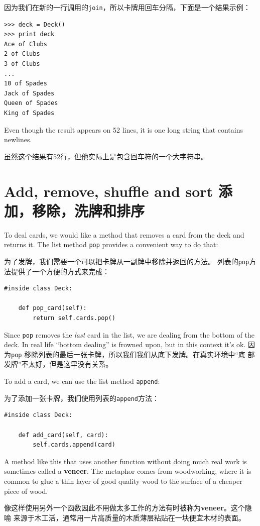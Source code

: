\documentclass[10pt]{book}
\begin{document}
\begin{CJK}{UTF8}{gbsn}
因为我们在新的一行调用的{\tt join}，所以卡牌用回车分隔，下面是一个结果示例：

\begin{verbatim}
>>> deck = Deck()
>>> print deck
Ace of Clubs
2 of Clubs
3 of Clubs
...
10 of Spades
Jack of Spades
Queen of Spades
King of Spades
\end{verbatim}
%
Even though the result appears on 52 lines, it is
one long string that contains newlines.

虽然这个结果有52行，但他实际上是包含回车符的一个大字符串。


\section{Add, remove, shuffle and sort 添加，移除，洗牌和排序}

To deal cards, we would like a method that
removes a card from the deck and returns it.
The list method {\tt pop} provides a convenient way to do that:

为了发牌，我们需要一个可以把卡牌从一副牌中移除并返回的方法。
列表的{\tt pop}方法提供了一个方便的方式来完成：

\begin{verbatim}
#inside class Deck:

    def pop_card(self):
        return self.cards.pop()
\end{verbatim}
%
Since {\tt pop} removes the {\em last} card in the list, we are
dealing from the bottom of the deck.  In real life ``bottom dealing'' is
frowned upon,
but in this context it's ok.
因为{\tt pop} 移除列表的最后一张卡牌，所以我们我们从底下发牌。在真实环境中``底
部发牌''不太好，但是这里没有关系。

To add a card, we can use the list method {\tt append}:

为了添加一张卡牌，我们使用列表的{\tt append}方法：

\begin{verbatim}
#inside class Deck:

    def add_card(self, card):
        self.cards.append(card)
\end{verbatim}
%
A method like this that uses another function without doing
much real work is sometimes called a {\bf veneer}.  The metaphor
comes from woodworking, where it is common to glue a thin
layer of good quality wood to the surface of a cheaper piece of
wood.

像这样使用另外一个函数因此不用做太多工作的方法有时被称为{\bf veneer}。这个隐喻
来源于木工活，通常用一片高质量的木质薄层粘贴在一块便宜木材的表面。


\end{CJK}
\end{document}
